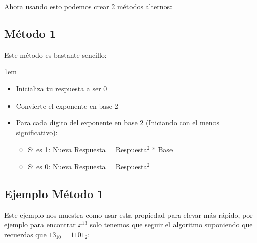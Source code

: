 \documentclass[12pt, fleqn]{report}                             %
\newenvironment{SmallIndentation}[1][0.75em]                    %
    {\begin{adjustwidth}{#1}{}\begin{footnotesize}}                 %
    {\end{footnotesize}\end{adjustwidth}}                           %
\begin{document}
        Ahora usando esto podemos crear 2 métodos alternos:

        \clearpage
        \subsection*{Método 1}

            Este método es bastante sencillo:

            \begin{SmallIndentation}[1em]
                
                \begin{itemize}
                    \item   Inicializa tu respuesta a ser 0
                    \item   Convierte el exponente en base 2

                    \item Para cada digito del exponente en base 2 (Iniciando con
                          el menos significativo):
                        
                        \begin{itemize}
                            \item Si es 1: Nueva Respuesta = Respuesta$^2$ * Base 
                            \item Si es 0: Nueva Respuesta = Respuesta$^2$ 
                        \end{itemize}
                \end{itemize}

            \end{SmallIndentation}


            


        \subsection*{Ejemplo Método 1}



            Este ejemplo nos muestra como usar esta propiedad para elevar más rápido, por ejemplo para encontrar
            $x^{13}$ solo tenemos que seguir el algoritmo suponiendo que recuerdas que $13_{10} = 1101_{2}$:
\end{document}
